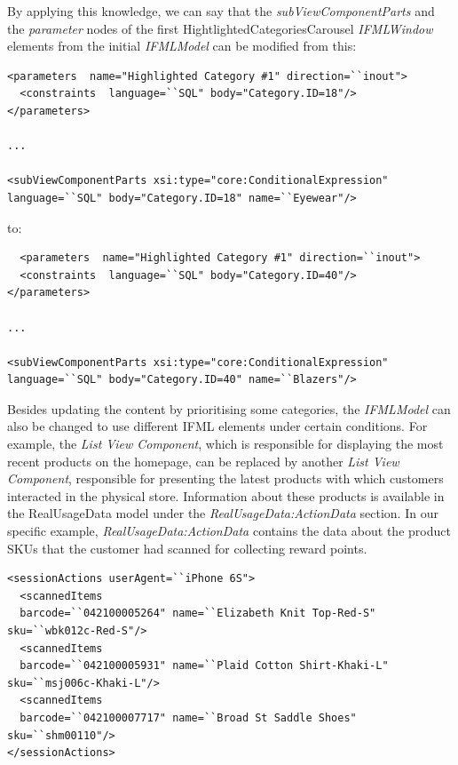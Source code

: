 By applying this knowledge, we can say that the \textit{subViewComponentParts} and the \textit{parameter} nodes of the first HightlightedCategoriesCarousel \textit{IFMLWindow} elements from the initial \textit{IFMLModel} can be modified from this:

\vspace{0.5cm}
\lstset{language=XML}
\begin{lstlisting} 
<parameters  name="Highlighted Category #1" direction=``inout">
  <constraints  language=``SQL" body="Category.ID=18"/>
</parameters>

...

<subViewComponentParts xsi:type="core:ConditionalExpression"  language=``SQL" body="Category.ID=18" name=``Eyewear"/>
\end{lstlisting}
\vspace{0.5cm}

to:

\vspace{0.5cm}
\lstset{language=XML}
\begin{lstlisting} 
  <parameters  name="Highlighted Category #1" direction=``inout">
  <constraints  language=``SQL" body="Category.ID=40"/>
</parameters>

...

<subViewComponentParts xsi:type="core:ConditionalExpression"  language=``SQL" body="Category.ID=40" name=``Blazers"/>
\end{lstlisting}
\vspace{0.5cm}

Besides updating the content by prioritising some categories, the \textit{IFMLModel} can also be changed to use different IFML elements under certain conditions. For example, the \textit{List View Component}, which is responsible for displaying the most recent products on the homepage, can be replaced by another \textit{List View Component}, responsible for presenting the latest products with which customers interacted in the physical store. Information about these products is available in the RealUsageData model under the \textit{RealUsageData:ActionData} section. In our specific example, \textit{RealUsageData:ActionData} contains the data about the product SKUs that the customer had scanned for collecting reward points.

\vspace{0.5cm}
\lstset{language=XML}
\begin{lstlisting} 
<sessionActions userAgent=``iPhone 6S">
  <scannedItems 
  barcode=``042100005264" name=``Elizabeth Knit Top-Red-S" sku=``wbk012c-Red-S"/>
  <scannedItems 
  barcode=``042100005931" name=``Plaid Cotton Shirt-Khaki-L" sku=``msj006c-Khaki-L"/>
  <scannedItems 
  barcode=``042100007717" name=``Broad St Saddle Shoes" sku=``shm00110"/>
</sessionActions>
\end{lstlisting}
\vspace{0.5cm}


